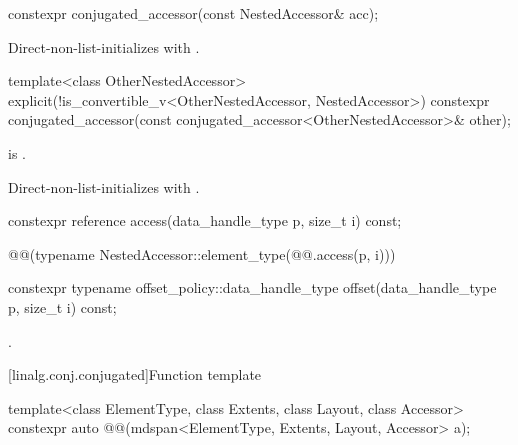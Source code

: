 %
\begin{itemdecl}
constexpr conjugated_accessor(const NestedAccessor& acc);
\end{itemdecl}

\begin{itemdescr}
\pnum
\effects
Direct-non-list-initializes
 with .
\end{itemdescr}

%
\begin{itemdecl}
template<class OtherNestedAccessor>
  explicit(!is_convertible_v<OtherNestedAccessor, NestedAccessor>)
    constexpr conjugated_accessor(const conjugated_accessor<OtherNestedAccessor>& other);
\end{itemdecl}

\begin{itemdescr}
\pnum
\constraints
{}
is .

\pnum
\effects
Direct-non-list-initializes 
with .
\end{itemdescr}

%
\begin{itemdecl}
constexpr reference access(data_handle_type p, size_t i) const;
\end{itemdecl}

\begin{itemdescr}
\pnum
\returns
\begin{codeblock}
@@(typename NestedAccessor::element_type(@@.access(p, i)))
\end{codeblock}
\end{itemdescr}

%
\begin{itemdecl}
constexpr typename offset_policy::data_handle_type offset(data_handle_type p, size_t i) const;
\end{itemdecl}

\begin{itemdescr}
\pnum
\returns
{}.
\end{itemdescr}

[linalg.conj.conjugated]{Function template }

\begin{itemdecl}
  template<class ElementType, class Extents, class Layout, class Accessor>
    constexpr auto @@(mdspan<ElementType, Extents, Layout, Accessor> a);
\end{itemdecl}

